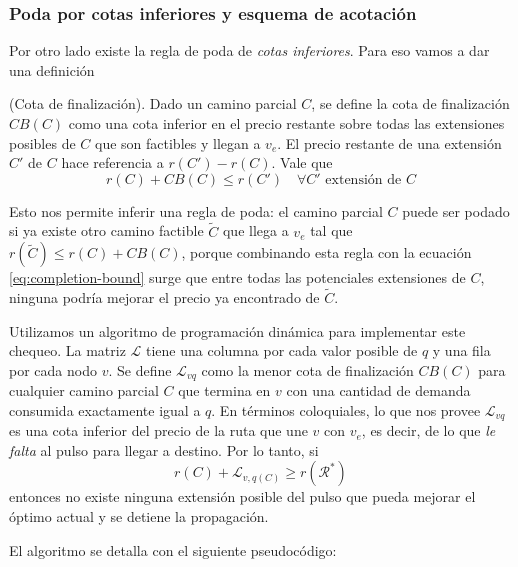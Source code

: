 \subsubsection{Poda por cotas inferiores y esquema de acotación}
\label{subsubsection:pulse-lower-bound}

Por otro lado existe la regla de poda de \emph{cotas inferiores}. Para eso vamos a dar una definición

\begin{definition}
    (Cota de finalización).
    Dado un camino parcial $C$, se define la cota de finalización $CB(C)$ como una cota inferior en el precio restante sobre todas las extensiones posibles de $C$  que son factibles y llegan a $v_e$. El precio restante de una extensión $C'$ de $C$ hace referencia a $r(C') - r(C)$. Vale que
    \begin{equation}
    \label{eq:completion-bound}
        r(C) + CB(C) \leq r(C') \quad \forall C' \text{ extensión de } C
    \end{equation}
\end{definition}

Esto nos permite inferir una regla de poda: el camino parcial $C$ puede ser podado si ya existe otro camino factible $\tilde{C}$ que llega a $v_e$ tal que $r(\tilde{C}) \leq r(C) + CB(C)$, porque combinando esta regla con la ecuación \ref{eq:completion-bound} surge que entre todas las potenciales extensiones de $C$, ninguna podría mejorar el precio ya encontrado de $\tilde{C}$.

Utilizamos un algoritmo de programación dinámica para implementar este chequeo. La matriz $\mathscr{L}$ tiene una columna por cada valor posible de $q$ y una fila por cada nodo $v$. Se define $\mathscr{L}_{vq}$ como la menor cota de finalización $CB(C)$ para cualquier camino parcial $C$ que termina en $v$ con una cantidad de demanda consumida exactamente igual a $q$. En términos coloquiales, lo que nos provee $\mathscr{L}_{vq}$ es una cota inferior del precio de la ruta que une $v$ con $v_e$, es decir, de lo que \emph{le falta} al pulso para llegar a destino. Por lo tanto, si 
\begin{equation}
\label{eq:completion-bound-check}
    r(C) + \mathscr{L}_{v, q(C)} \geq r(\mathscr{R}^{*})
\end{equation}
entonces no existe ninguna extensión posible del pulso que pueda mejorar el óptimo actual y se detiene la propagación.

El algoritmo se detalla con el siguiente pseudocódigo:

